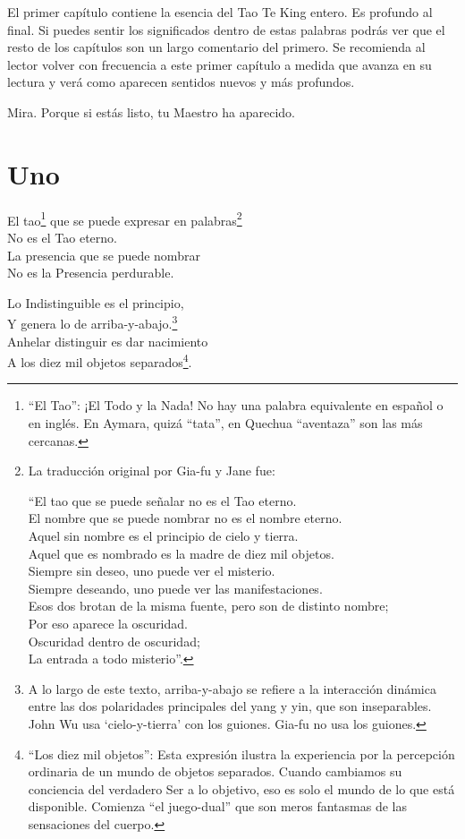 \documentclass[hidelinks]{memoir}
\begin{document}
	El primer capítulo contiene la esencia del Tao Te King entero. Es
	profundo al final. Si puedes sentir los significados dentro de estas
	palabras podrás ver que el resto de los capítulos son un largo
	comentario del primero. Se recomienda al lector volver con frecuencia a
	este primer capítulo a medida que avanza en su lectura y verá como
	aparecen sentidos nuevos y más profundos.
	
	Mira. Porque si estás listo, tu Maestro ha aparecido.
	
	\chapter*{Uno}
	
	El tao\footnote{``El Tao'': ¡El Todo y la Nada! No hay una palabra equivalente en
		español o en inglés. En Aymara, quizá ``tata'', en Quechua ``aventaza''
		son las más cercanas.} que se puede expresar en palabras\footnote{La traducción original por Gia-fu y Jane fue:
		
		``El tao que se puede señalar no es el Tao eterno.\\
		El nombre que se puede nombrar no es el nombre eterno.\\
		Aquel sin nombre es el principio de cielo y tierra.\\
		Aquel que es nombrado es la madre de diez mil objetos.\\
		Siempre sin deseo, uno puede ver el misterio.\\
		Siempre deseando, uno puede ver las manifestaciones.\\
		Esos dos brotan de la misma fuente, pero son de distinto nombre;\\
		Por eso aparece la oscuridad.\\
		Oscuridad dentro de oscuridad;\\
		La entrada a todo misterio''.}\\
	No es el Tao eterno.\\
	La presencia que se puede nombrar\\
	No es la Presencia perdurable.
	
	Lo Indistinguible es el principio,\\
	Y genera lo de arriba-y-abajo.\footnote{A lo largo de este texto, arriba-y-abajo se refiere a la interacción dinámica entre las dos polaridades principales del yang y yin, que son inseparables. John Wu usa `cielo-y-tierra' con los guiones. Gia-fu no usa los guiones.}\\
	Anhelar distinguir es dar nacimiento\\
	A los diez mil objetos separados\footnote{``Los diez mil objetos'': Esta expresión ilustra la experiencia por la
		percepción ordinaria de un mundo de objetos separados. Cuando cambiamos
		su conciencia del verdadero Ser a lo objetivo, eso es solo el mundo de
		lo que está disponible. Comienza ``el juego-dual'' que son meros
		fantasmas de las sensaciones del cuerpo.}.
	
\end{document}
